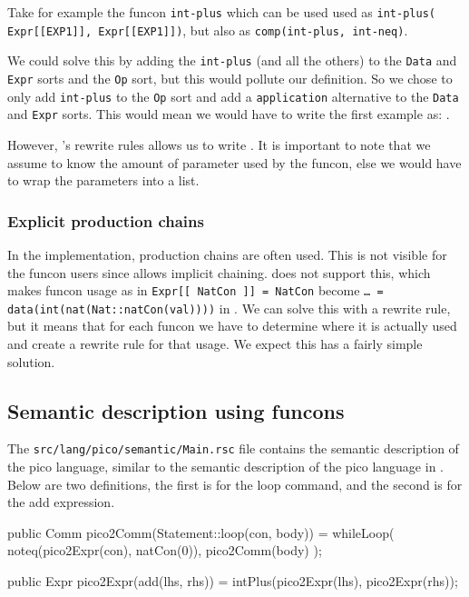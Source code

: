 \documentclass[a4paper, oneside, notitlepage]{article}
\newcommand{\ASFSDF}{\textsmaller{ASF\hspace{-.05em}\raisebox{.4ex}{\tiny\textbf{+}}SDF}\xspace}
\newcommand{\ADT}{\textsmaller{ADT}\xspace}
\newcommand{\filename}[1]{\texttt{#1}\xspace}
\newcommand{\code}[1]{\texttt{#1}\xspace}
\begin{document}
		Take for example the funcon \code{int-plus} which can be used used as 
		\code{int-plus(	Expr[[EXP1]], Expr[[EXP1]])}, 
		but also as 
		\code{comp(int-plus, int-neq)}.

		We could solve this by adding the \code{int-plus} (and all the others)
		to the \code{Data} and \code{Expr} sorts and the \code{Op} sort, but this would
		pollute our \ADT definition.
		So we chose to only add \code{int-plus} to the \code{Op} sort and add a
		\code{application} alternative to the \code{Data} and \code{Expr} sorts.
		This would mean we would have to write the first example as:
		.

		However, \Rascal's rewrite rules allows us to write 
		.
		It is important to note that we assume to know the amount of parameter
		used by the funcon, else we would have to wrap the parameters
		into a list.

		\subsubsection{Explicit production chains}
		In the \ASFSDF implementation, production chains are often used.
		This is not visible for the funcon users since \ASFSDF allows implicit
		chaining.
		\Rascal does not support this, which makes funcon usage
		as in \code{Expr[[ NatCon ]] = NatCon} become
		\code{\ldots\ = data(int(nat(Nat::natCon(val))))} in \Rascal.
		We can solve this with a rewrite rule, but it means that for each funcon
		we have to determine where it is actually used and create a rewrite rule
		for that usage.
		We expect this has a fairly simple solution.
	
	\subsection{Semantic description using funcons}

		The \filename{src/lang/pico/semantic/Main.rsc} file contains the semantic
		description of the pico language, similar to the semantic description of
		the pico language in \ASFSDF.
		Below are two definitions, the first is for the loop command, and the
		second is for the add expression.

\begin{rascal}
public Comm pico2Comm(Statement::loop(con, body)) =
	whileLoop( 
		noteq(pico2Expr(con), natCon(0)), 
		pico2Comm(body)
	);

public Expr pico2Expr(add(lhs, rhs)) = intPlus(pico2Expr(lhs), pico2Expr(rhs));
\end{rascal}
\end{document}
